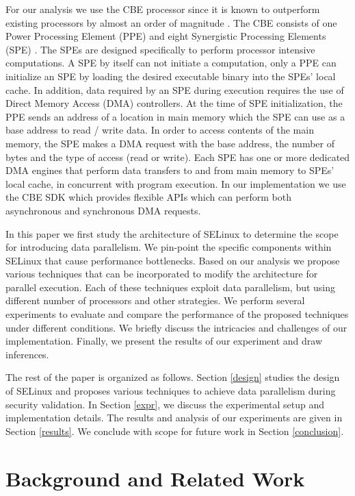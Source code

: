 \documentclass[conference]{IEEEtran}
\begin{document}
For our analysis we use the CBE processor since it is
known to outperform existing processors by almost an order of
magnitude \cite{CBEArch}. The CBE consists of one Power Processing
Element (PPE) and eight Synergistic Processing Elements (SPE)
\cite{CBEArch}.  The SPEs are designed specifically to perform
processor intensive computations. A SPE by itself can not initiate a
computation, only a PPE can initialize an SPE by loading the desired
executable binary into the SPEs' local cache. In addition, data
required by an SPE during execution requires the use of Direct Memory
Access (DMA) controllers. At the time of SPE initialization, the PPE
sends an address of a location in main memory which the SPE can use as
a base address to read / write data. In order to access contents of
the main memory, the SPE makes a DMA request with the base address,
the number of bytes and the type of access (read or write). Each SPE
has one or more dedicated DMA engines that perform data transfers to
and from main memory to SPEs' local cache, in concurrent with program
execution. In our implementation we use the CBE SDK which provides
flexible APIs which can perform both asynchronous and synchronous DMA
requests.

In this paper we first study the architecture of SELinux to determine
the scope for introducing data parallelism. We pin-point
the specific components within SELinux that cause performance
bottlenecks. Based on our analysis we propose various techniques
that can be incorporated to modify the architecture for parallel
execution. Each of these techniques exploit data parallelism, but
using different number of processors and other strategies. We
perform several experiments to evaluate and compare the performance of
the proposed techniques under different conditions. We briefly discuss
the intricacies and challenges of our implementation. Finally, we
present the results of our experiment and draw inferences.

The rest of the paper is organized as follows. Section \ref{design}
studies the design of SELinux and proposes various techniques to
achieve data parallelism during security validation. In Section
\ref{expr}, we discuss the experimental setup and implementation
details. The results and analysis of our experiments are given in
Section \ref{results}. We conclude with scope for future work in
Section \ref{conclusion}.

\section{Background and Related Work}\label{related}
\end{document}
